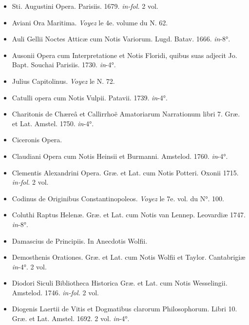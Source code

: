 \documentclass[a4paper, 18pt, oneside]{article}
\begin{document}
\begin{itemize}
    \item Sti. Augustini Opera. Parisiis. 1679. \emph{in-fol.} 2 vol.

    \item Aviani Ora Maritima. \emph{Voyez} le 4e. volume du N. 62.

    \item Auli Gellii Noctes Atticæ cum Notis Variorum. Lugd. Batav. 1666. \emph{in}-8°.

    \item Ausonii Opera cum Interpretatione et Notis Floridi, quibus suas adjecit Jo. Bapt. Souchai Parisiis. 1730. \emph{in}-4°.

    \item Julius Capitolinus. \emph{Voyez} le N. 72.

    \item Catulli opera cum Notis Vulpii. Patavii. 1739. \emph{in}-4°.

    \item Charitonis de Chæreâ et Callirrhoë Amatoriarum Narrationum libri 7. Græ. et Lat. Amstel. 1750. \emph{in}-4°.

    \item Ciceronis Opera.

    \item Claudiani Opera cum Notis Heinsii et Burmanni. Amstelod. 1760. \emph{in}-4°.

    \item Clementis Alexandrini Opera. Græ. et Lat. cum Notis Potteri. Oxonii 1715. \emph{in-fol.} 2 vol.

    \item Codinus de Originibus Constantinopoleos. \emph{Voyez} le 7e. vol. du N°. 100.

    \item Coluthi Raptus Helenæ. Græ. et Lat. cum Notis van Lennep. Leovardiæ 1747. \emph{in}-8°.

    \item Damascius de Principiis. In Anecdotis Wolfii.

    \item Demosthenis Orationes. Græ. et Lat. cum Notis Wolfii et Taylor. Cantabrigiæ \emph{in}-4°. 2 vol.

    \item Diodori Siculi Bibliotheca Historica Græ. et Lat. cum Notis Wesselingii. Amstelod. 1746. \emph{in-fol.} 2 vol.

    \item Diogenis Laertii de Vitis et Dogmatibus clarorum Philosophorum. Libri 10. Græ. et Lat. Amstel. 1692. 2 vol. \emph{in}-4°.


\end{itemize}
\end{document}
